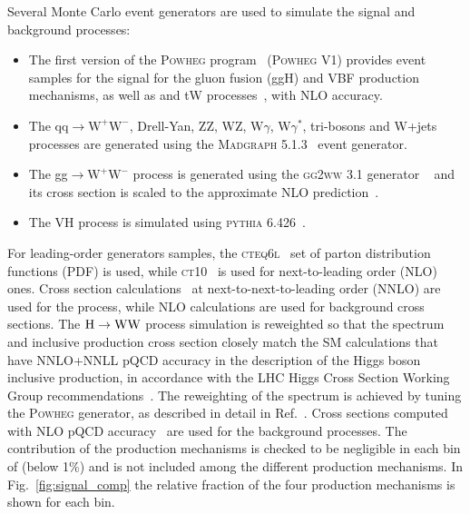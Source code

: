 Several Monte Carlo event generators are used to simulate the signal and background processes:
\begin{itemize}
\item The first version of the \textsc{Powheg} program~\cite{Kramer:2005hw,Frixione:2007vw,Lavesson:2008ah,Alioli:2008tz, Nason:2009ai} (\textsc{Powheg V1}) provides event samples for the \hww signal
for the gluon fusion (ggH) and VBF production mechanisms, as well as \ttbar and tW processes~\cite{Alioli:2011as}, with NLO accuracy.
\item The $\mathrm{qq} \to \mathrm{W^{+}W^{-}}$, Drell-Yan, ZZ, WZ, W$\gamma$, W$\gamma^*$, tri-bosons and W+jets processes are generated using
the \textsc{Madgraph 5.1.3}~\cite{Alwall:2014hca} event generator.
\item The gg$\to \mathrm{W^{+}W^{-}}$ process is generated using the \textsc{gg2ww} 3.1 generator ~\cite{Binoth:2006mf} and its cross section is scaled to the approximate NLO prediction~\cite{Bonvini:2013jha,Passarino:2013bha}.
\item The VH process is simulated using \textsc{pythia 6.426}~\cite{Sjostrand:2006za}.
\end{itemize}
For leading-order generators samples, the \textsc{cteq6l}~\cite{Lai:2010nw} set of parton distribution functions
(PDF) is used, while \textsc{ct10}~\cite{Lai:2010vv} is used for next-to-leading order (NLO) ones.
Cross section calculations~\cite{Dittmaier:2011ti} at next-to-next-to-leading order (NNLO) are used for the \hww process, while NLO calculations are used for background cross sections.
The ${\mathrm{H}\to\mathrm{WW}}$ process simulation is reweighted so that the \pth{} spectrum and inclusive production cross section closely match the SM calculations that have NNLO+NNLL pQCD accuracy in the description of the Higgs boson inclusive production, in accordance with the LHC Higgs Cross Section Working Group recommendations~\cite{Heinemeyer:2013tqa}.
The reweighting of the \pth{} spectrum is achieved by tuning the \textsc{Powheg} generator, as described in detail in Ref.~\cite{Alioli:2010xd}.
Cross sections computed with NLO pQCD accuracy~\cite{Heinemeyer:2013tqa} are used for the background processes.
The contribution of the \ttH production mechanisms is checked to be negligible in each bin of \pth (below 1\%) and is not included among the different production mechanisms. In Fig.~\ref{fig:signal_comp} the relative fraction of the four production mechanisms is shown for each \pth bin.

